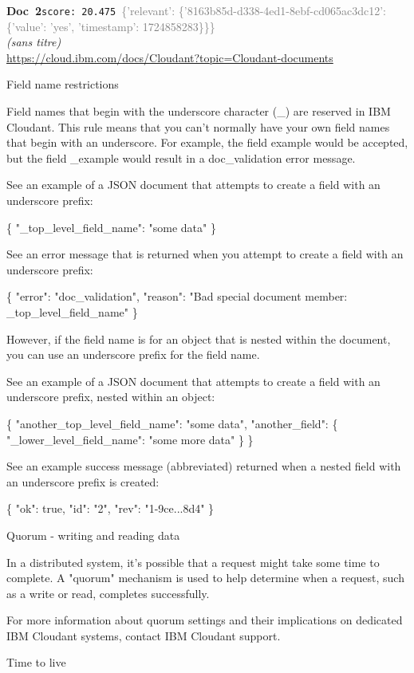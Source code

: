\documentclass[a4paper,11pt]{article}
\begin{document}
\begin{docenv}
{\footnotesize\textcolor{doccolor}{\textbf{Doc~2}}}\hfill{\tiny\texttt{score:~20.475}}\ {\tiny\textcolor{gray}{\{'relevant': \{'8163b85d-d338-4ed1-8ebf-cd065ac3dc12': \{'value': 'yes', 'timestamp': 1724858283\}\}\}}}\\[3pt]
{\small\textit{(sans titre)}}\\[2pt]
{\tiny\url{https://cloud.ibm.com/docs/Cloudant?topic=Cloudant-documents}}\\[4pt]
{\footnotesize 
Field name restrictions 

Field names that begin with the underscore character (\_) are reserved in IBM Cloudant. This rule means that you can't normally have your own field names that begin with an underscore. For example, the field example would be accepted, but the field \_example would result in a doc\_validation error message.

See an example of a JSON document that attempts to create a field with an underscore prefix:

\{
"\_top\_level\_field\_name": "some data"
\}

See an error message that is returned when you attempt to create a field with an underscore prefix:

\{
"error": "doc\_validation",
"reason": "Bad special document member: \_top\_level\_field\_name"
\}

However, if the field name is for an object that is nested within the document, you can use an underscore prefix for the field name.

See an example of a JSON document that attempts to create a field with an underscore prefix, nested within an object:

\{
"another\_top\_level\_field\_name": "some data",
"another\_field": \{
"\_lower\_level\_field\_name": "some more data"
\}
\}

See an example success message (abbreviated) returned when a nested field with an underscore prefix is created:

\{
"ok": true,
"id": "2",
"rev": "1-9ce...8d4"
\}







 Quorum - writing and reading data 

In a distributed system, it's possible that a request might take some time to complete. A "quorum" mechanism is used to help determine when a request, such as a write or read, completes successfully.

For more information about quorum settings and their implications on dedicated IBM Cloudant systems, contact IBM Cloudant support.





 Time to live}
\end{docenv}
\end{document}
